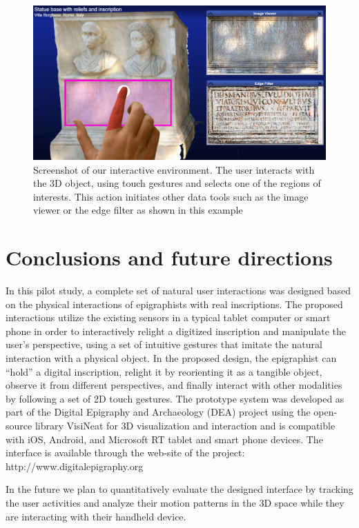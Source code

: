 \documentclass[amsthm,ebook]{saparticle}
\begin{document}
\begin{figure}[!bp]
\centering
 \includegraphics[width=\columnwidth]{EAGLE2016cameraready-img006.png}
\caption{Screenshot of our interactive environment. The user interacts with the 3D object, using touch gestures and
selects one of the regions of interests. This action initiates other data tools such as the image viewer or the edge
filter as shown in this example}
\label{fig:4}
\end{figure}

\section{Conclusions and future directions}


\noindent In this pilot study, a complete set of natural user interactions was designed based on the physical interactions of
epigraphists with real inscriptions. The proposed interactions utilize the existing sensors in a typical tablet
computer or smart phone in order to interactively relight a digitized inscription and manipulate the user's
perspective, using a set of intuitive gestures that imitate the natural interaction with a physical object. In the
proposed design, the epigraphist can ``hold'' a digital inscription, relight it by
reorienting it as a tangible object, observe it from different perspectives, and finally interact with other modalities
by following a set of 2D touch gestures. The prototype system was developed as part of the Digital Epigraphy and
Archaeology (DEA) project using the open-source library VisiNeat for 3D visualization and interaction and is compatible
with iOS, Android, and Microsoft RT tablet and smart phone devices. The interface is available through the web-site of
the project: http://www.digitalepigraphy.org

In the future we plan to quantitatively evaluate the designed interface by tracking the user activities and analyze
their motion patterns in the 3D space while they are interacting with their handheld device. 
\end{document}
